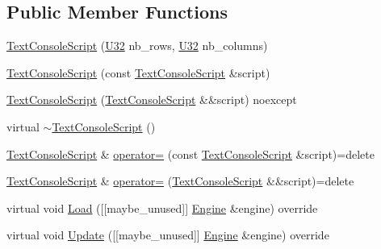 \subsection*{Public Member Functions}
\begin{DoxyCompactItemize}
\item 
\mbox{\hyperlink{classmage_1_1script_1_1_text_console_script_a5b26c235c08fb2e443ce3f728985a41e}{Text\+Console\+Script}} (\mbox{\hyperlink{namespacemage_aa5d6eaabaac3cdd01873d6a3d27e90f3}{U32}} nb\+\_\+rows, \mbox{\hyperlink{namespacemage_aa5d6eaabaac3cdd01873d6a3d27e90f3}{U32}} nb\+\_\+columns)
\item 
\mbox{\hyperlink{classmage_1_1script_1_1_text_console_script_a82c8a2c15aa51befbfe6341e463057db}{Text\+Console\+Script}} (const \mbox{\hyperlink{classmage_1_1script_1_1_text_console_script}{Text\+Console\+Script}} \&script)
\item 
\mbox{\hyperlink{classmage_1_1script_1_1_text_console_script_a46052af67069fef12a8ff9de75cce382}{Text\+Console\+Script}} (\mbox{\hyperlink{classmage_1_1script_1_1_text_console_script}{Text\+Console\+Script}} \&\&script) noexcept
\item 
virtual \mbox{\hyperlink{classmage_1_1script_1_1_text_console_script_af0959c8a4f21bb4f9b5553dffc5710b9}{$\sim$\+Text\+Console\+Script}} ()
\item 
\mbox{\hyperlink{classmage_1_1script_1_1_text_console_script}{Text\+Console\+Script}} \& \mbox{\hyperlink{classmage_1_1script_1_1_text_console_script_a68af2a144f641c9813b333544fe3562a}{operator=}} (const \mbox{\hyperlink{classmage_1_1script_1_1_text_console_script}{Text\+Console\+Script}} \&script)=delete
\item 
\mbox{\hyperlink{classmage_1_1script_1_1_text_console_script}{Text\+Console\+Script}} \& \mbox{\hyperlink{classmage_1_1script_1_1_text_console_script_ae8560dece8d507ee338dda68e3176fed}{operator=}} (\mbox{\hyperlink{classmage_1_1script_1_1_text_console_script}{Text\+Console\+Script}} \&\&script)=delete
\item 
virtual void \mbox{\hyperlink{classmage_1_1script_1_1_text_console_script_a1e5a7bdff2d47b835932d7220a4e2571}{Load}} (\mbox{[}\mbox{[}maybe\+\_\+unused\mbox{]}\mbox{]} \mbox{\hyperlink{classmage_1_1_engine}{Engine}} \&engine) override
\item 
virtual void \mbox{\hyperlink{classmage_1_1script_1_1_text_console_script_ad619f93a946660b30f5e39821778f7b0}{Update}} (\mbox{[}\mbox{[}maybe\+\_\+unused\mbox{]}\mbox{]} \mbox{\hyperlink{classmage_1_1_engine}{Engine}} \&engine) override

\end{DoxyCompactItemize}
